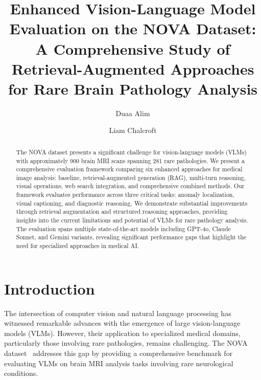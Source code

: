 \documentclass[runningheads]{llncs}
\begin{document}
%
\title{Enhanced Vision-Language Model Evaluation on the NOVA Dataset: A Comprehensive Study of Retrieval-Augmented Approaches for Rare Brain Pathology Analysis}
%
%
\author{Duaa Alim \and Liam Chalcroft}
%
%
%
\maketitle
%
\begin{abstract}
The NOVA dataset presents a significant challenge for vision-language models (VLMs) with approximately 900 brain MRI scans spanning 281 rare pathologies. We present a comprehensive evaluation framework comparing six enhanced approaches for medical image analysis: baseline, retrieval-augmented generation (RAG), multi-turn reasoning, visual operations, web search integration, and comprehensive combined methods. Our framework evaluates performance across three critical tasks: anomaly localization, visual captioning, and diagnostic reasoning. We demonstrate substantial improvements through retrieval augmentation and structured reasoning approaches, providing insights into the current limitations and potential of VLMs for rare pathology analysis. The evaluation spans multiple state-of-the-art models including GPT-4o, Claude Sonnet, and Gemini variants, revealing significant performance gaps that highlight the need for specialized approaches in medical AI.

\end{abstract}

\section{Introduction}

The intersection of computer vision and natural language processing has witnessed remarkable advances with the emergence of large vision-language models (VLMs). However, their application to specialized medical domains, particularly those involving rare pathologies, remains challenging. The NOVA dataset~\cite{nova2024} addresses this gap by providing a comprehensive benchmark for evaluating VLMs on brain MRI analysis tasks involving rare neurological conditions.
\end{document}
